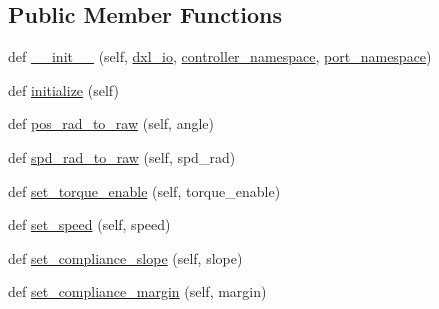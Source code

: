 \subsection*{Public Member Functions}
\begin{DoxyCompactItemize}
\item 
def \hyperlink{classdynamixel__controllers_1_1joint__position__controller__dual__motor_1_1_joint_position_controller_dual_a03b1dfd80e092d7d48259bd603262efe}{\+\_\+\+\_\+init\+\_\+\+\_\+} (self, \hyperlink{classdynamixel__controllers_1_1joint__controller_1_1_joint_controller_a8be2fb1ed88aee6590c938122361c780}{dxl\+\_\+io}, \hyperlink{classdynamixel__controllers_1_1joint__controller_1_1_joint_controller_a8b34f86e463a0ce3fcf52a09b6ea7dc2}{controller\+\_\+namespace}, \hyperlink{classdynamixel__controllers_1_1joint__controller_1_1_joint_controller_ac89de71afa48761fb662ac2917a5b9d3}{port\+\_\+namespace})
\item 
def \hyperlink{classdynamixel__controllers_1_1joint__position__controller__dual__motor_1_1_joint_position_controller_dual_a87a789b223b9a34aec5a1538ee24d16a}{initialize} (self)
\item 
def \hyperlink{classdynamixel__controllers_1_1joint__position__controller__dual__motor_1_1_joint_position_controller_dual_a8db51ee1aefb3eec4fec62ed230936a5}{pos\+\_\+rad\+\_\+to\+\_\+raw} (self, angle)
\item 
def \hyperlink{classdynamixel__controllers_1_1joint__position__controller__dual__motor_1_1_joint_position_controller_dual_a5a96d3bd5d40feb12ffcb581d7acedc1}{spd\+\_\+rad\+\_\+to\+\_\+raw} (self, spd\+\_\+rad)
\item 
def \hyperlink{classdynamixel__controllers_1_1joint__position__controller__dual__motor_1_1_joint_position_controller_dual_a33b46f09e18958875a5111d9e804b8f6}{set\+\_\+torque\+\_\+enable} (self, torque\+\_\+enable)
\item 
def \hyperlink{classdynamixel__controllers_1_1joint__position__controller__dual__motor_1_1_joint_position_controller_dual_a5674e2c2206f1442001ba7684fdf5dcc}{set\+\_\+speed} (self, speed)
\item 
def \hyperlink{classdynamixel__controllers_1_1joint__position__controller__dual__motor_1_1_joint_position_controller_dual_ab4010d4ed4f5872e422865bdc8a86c96}{set\+\_\+compliance\+\_\+slope} (self, slope)
\item 
def \hyperlink{classdynamixel__controllers_1_1joint__position__controller__dual__motor_1_1_joint_position_controller_dual_a03c33eab77c79135ef8f40752206c292}{set\+\_\+compliance\+\_\+margin} (self, margin)

\end{DoxyCompactItemize}
